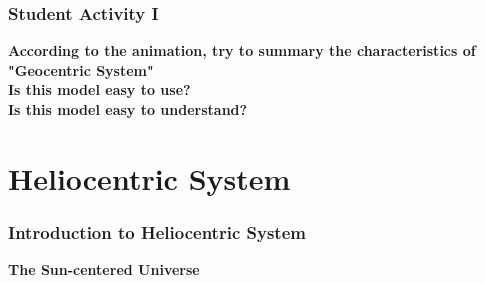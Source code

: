 \documentclass[aspectratio=1611, 9pt]{beamer}
\begin{document}
\begin{frame}
  \frametitle{Student Activity I}
  \begin{center}
   \textbf{According to the animation, try to summary the characteristics of "Geocentric System"}\\
    \textbf{Is this model easy to use?}\\
    \textbf{Is this model easy to understand?}\\
  \end{center}
\end{frame}

\section{Heliocentric System}
\begin{frame}
  \frametitle{Introduction to Heliocentric System}
  \begin{center}
    \textbf{The Sun-centered Universe}
  \end{center}
\end{frame}
\end{document}

